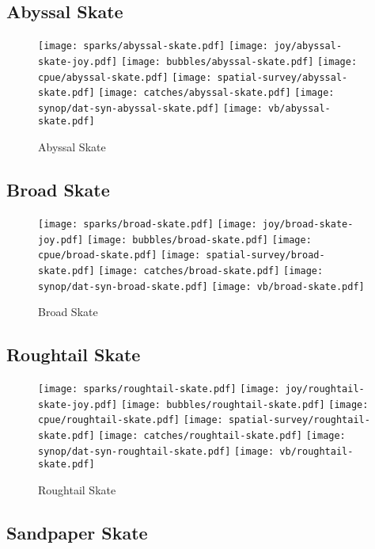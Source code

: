 \subsection*{Abyssal Skate}

\begin{figure}[htbp]
\centering
\texttt{[image: sparks/abyssal-skate.pdf]}
\texttt{[image: joy/abyssal-skate-joy.pdf]}
\texttt{[image: bubbles/abyssal-skate.pdf]}
\texttt{[image: cpue/abyssal-skate.pdf]}
\texttt{[image: spatial-survey/abyssal-skate.pdf]}
\texttt{[image: catches/abyssal-skate.pdf]}
\texttt{[image: synop/dat-syn-abyssal-skate.pdf]}
\texttt{[image: vb/abyssal-skate.pdf]}
\caption{Abyssal Skate}
\end{figure}
\clearpage
\subsection*{Broad Skate}

\begin{figure}[htbp]
\centering
\texttt{[image: sparks/broad-skate.pdf]}
\texttt{[image: joy/broad-skate-joy.pdf]}
\texttt{[image: bubbles/broad-skate.pdf]}
\texttt{[image: cpue/broad-skate.pdf]}
\texttt{[image: spatial-survey/broad-skate.pdf]}
\texttt{[image: catches/broad-skate.pdf]}
\texttt{[image: synop/dat-syn-broad-skate.pdf]}
\texttt{[image: vb/broad-skate.pdf]}
\caption{Broad Skate}
\end{figure}
\clearpage
\subsection*{Roughtail Skate}

\begin{figure}[htbp]
\centering
\texttt{[image: sparks/roughtail-skate.pdf]}
\texttt{[image: joy/roughtail-skate-joy.pdf]}
\texttt{[image: bubbles/roughtail-skate.pdf]}
\texttt{[image: cpue/roughtail-skate.pdf]}
\texttt{[image: spatial-survey/roughtail-skate.pdf]}
\texttt{[image: catches/roughtail-skate.pdf]}
\texttt{[image: synop/dat-syn-roughtail-skate.pdf]}
\texttt{[image: vb/roughtail-skate.pdf]}
\caption{Roughtail Skate}
\end{figure}
\clearpage
\subsection*{Sandpaper Skate}

